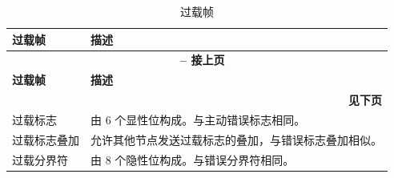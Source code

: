 \begin{longtable}[c]{|p{2.5cm}|p{13cm}|} 
    
  \caption{过载帧}
  \label{tab:twai-overload-frame} 
  \\\hline
  \rowcolor{lightgray}
  \textbf{过载帧} & \textbf{描述}
  \\\hline
  \endfirsthead
  
  \multicolumn{2}{c}{\bfseries \tablename\ \thetable{} -- 接上页}\\  \hline
  
  \rowcolor{lightgray}
    \textbf{过载帧} & \textbf{描述}
  \\\hline
  \endhead
  
  \multicolumn{2}{r}{\textbf{见下页}} \\
  \endfoot
  \endlastfoot
  
    过载标志 & 由 6 个显性位构成。与主动错误标志相同。
          \\\hline
    过载标志叠加 & 允许其他节点发送过载标志的叠加，与错误标志叠加相似。
           \\\hline
    过载分界符 & 由 8 个隐性位构成。与错误分界符相同。              \\\hline
\end{longtable}

